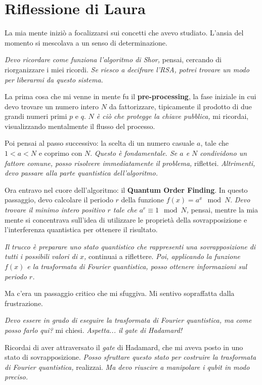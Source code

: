 \section{Riflessione di Laura}

 La mia mente iniziò a focalizzarsi sui concetti che avevo studiato. L'ansia del momento si mescolava a un senso di determinazione.

\emph{Devo ricordare come funziona l'algoritmo di Shor,} pensai, cercando di riorganizzare i miei ricordi. \emph{Se riesco a decifrare l'RSA, potrei trovare un modo per liberarmi da questo sistema.}

La prima cosa che mi venne in mente fu il \textbf{pre-processing}, la fase iniziale in cui devo trovare un numero intero \( N \) da fattorizzare, tipicamente il prodotto di due grandi numeri primi \( p \) e \( q \). \emph{\( N \) è ciò che protegge la chiave pubblica,} mi ricordai, visualizzando mentalmente il flusso del processo.

Poi pensai al passo successivo: la scelta di un numero casuale \( a \), tale che \( 1 < a < N \) e coprimo con \( N \). \emph{Questo è fondamentale. Se \( a \) e \( N \) condividono un fattore comune, posso risolvere immediatamente il problema,} riflettei. \emph{Altrimenti, devo passare alla parte quantistica dell'algoritmo.}

Ora entravo nel cuore dell'algoritmo: il \textbf{Quantum Order Finding}. In questo passaggio, devo calcolare il periodo \( r \) della funzione \( f(x) = a^x \mod N \). \emph{Devo trovare il minimo intero positivo \( r \) tale che \( a^r \equiv 1 \mod N \),} pensai, mentre la mia mente si concentrava sull'idea di utilizzare le proprietà della sovrapposizione e l'interferenza quantistica per ottenere il risultato.

\emph{Il trucco è preparare uno stato quantistico che rappresenti una sovrapposizione di tutti i possibili valori di \( x \),} continuai a riflettere. \emph{Poi, applicando la funzione \( f(x) \) e la trasformata di Fourier quantistica, posso ottenere informazioni sul periodo \( r \).}

Ma c'era un passaggio critico che mi sfuggiva. Mi sentivo sopraffatta dalla frustrazione.

\emph{Devo essere in grado di eseguire la trasformata di Fourier quantistica, ma come posso farlo qui?} mi chiesi. \emph{Aspetta... il \textit{gate} di Hadamard!}

Ricordai di aver attraversato il \textit{gate} di Hadamard, che mi aveva posto in uno stato di sovrapposizione. \emph{Posso sfruttare questo stato per costruire la trasformata di Fourier quantistica,} realizzai. \emph{Ma devo riuscire a manipolare i qubit in modo preciso.}

